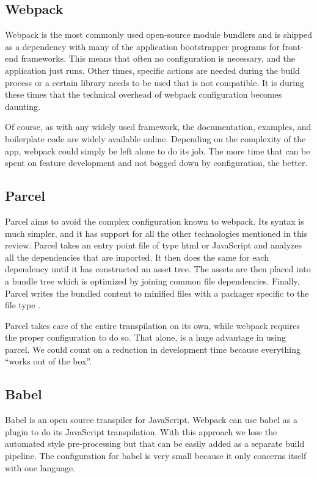     \subsection{Webpack}
    Webpack is the most commonly used open-source module bundlers and is shipped as a dependency with many of the application bootstrapper programs for front-end frameworks. This means that often no configuration is necessary, and the application just runs. Other times, specific actions are needed during the build process or a certain library needs to be used that is not compatible. It is during these times that the technical overhead of webpack configuration becomes daunting.
    
    Of course, as with any widely used framework, the documentation, examples, and boilerplate code are widely available online. Depending on the complexity of the app, webpack could simply be left alone to do its job. The more time that can be spent on feature development and not bogged down by configuration, the better.

    \subsection{Parcel}
    Parcel aims to avoid the complex configuration known to webpack. Its syntax is much simpler, and it has support for all the other technologies mentioned in this review. Parcel takes an entry point file of type html or JavaScript and analyzes all the dependencies that are imported. It then does the same for each dependency until it has constructed an asset tree. The assets are then placed into a bundle tree which is optimized by joining common file dependencies. Finally, Parcel writes the bundled content to minified files with a packager specific to the file type \cite{parcel}.
    
    Parcel takes care of the entire transpilation on its own, while webpack requires the proper configuration to do so. That alone, is a huge advantage in using parcel. We could count on a reduction in development time because everything “works out of the box”. 

    \subsection{Babel}
    Babel is an open source transpiler for JavaScript. Webpack can use babel as a plugin to do its JavaScript transpilation. With this approach we lose the automated style pre-processing but that can be easily added as a separate build pipeline. The configuration for babel is very small because it only concerns itself with one language.
    
